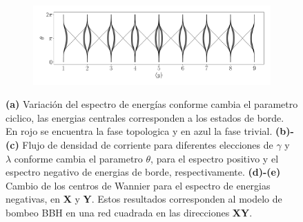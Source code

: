 \begin{figure}[h!]
     \begin{minipage}[h!]{1\textwidth}
        \begin{subfigure}[b!]{1.0 \textwidth}
            \caption{}
            \includegraphics[width=\textwidth]{Imagenes/Resultados_pump_Cuadrado/xy/wannier_centery.pdf}
        \end{subfigure}\hspace*{-0.5em}
    \end{minipage}\vspace*{-1em}
    
    \caption{\textbf{(a)} Variación del espectro de energías conforme cambia el parametro ciclico, las energias centrales corresponden a los estados de borde. En rojo se encuentra la fase topologica y en azul la fase trivial. \textbf{(b)-(c)} Flujo de densidad de corriente para diferentes elecciones de $\gamma$ y $\lambda$ conforme cambia el parametro $\theta$, para el espectro positivo y el espectro negativo de energias de borde, respectivamente. \textbf{(d)-(e)} Cambio de los centros de Wannier para el espectro de energias negativas, en \textbf{X} y \textbf{Y}. Estos resultados corresponden al modelo de bombeo BBH en una red cuadrada en las direcciones \textbf{XY}.}
    \label{fig:Pump_cuadrado_xy}
\end{figure}
